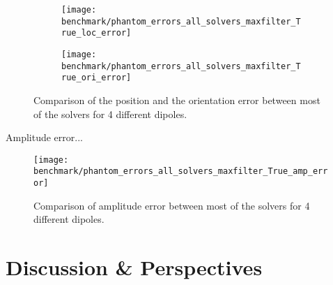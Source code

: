 \begin{sidewaysfigure}[ht]
        \centering
        \begin{subfigure}[b]{0.47\textwidth}
            \centering
            \texttt{[image: benchmark/phantom\_errors\_all\_solvers\_maxfilter\_True\_loc\_error]}
            \label{fig:all_solvers_loc_error}
        \end{subfigure}
		\hspace{25pt}
        \begin{subfigure}[b]{0.47\textwidth}  
            \centering 
            \texttt{[image: benchmark/phantom\_errors\_all\_solvers\_maxfilter\_True\_ori\_error]}
            \label{fig:tfmxneall_solvers_ori_error}
        \end{subfigure}

		\caption{Comparison of the position and the orientation error between most of the solvers for 4 different dipoles.\label{all_solvers_loc_error}}
\end{sidewaysfigure}

Amplitude error...
\begin{figure}
	\texttt{[image: benchmark/phantom\_errors\_all\_solvers\_maxfilter\_True\_amp\_error]}
	\caption{Comparison of amplitude error between most of the solvers for 4 different dipoles.\label{all_solvers_amp_error}}
\end{figure}


\section{Discussion \& Perspectives}
